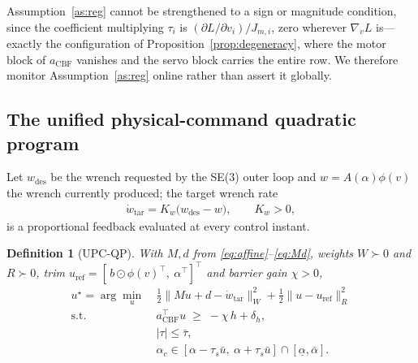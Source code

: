 \documentclass[letter, 10 pt, journal, twoside]{IEEEtran}
\theoremstyle{compact}
\newtheorem{definition}{Definition}
\begin{document}
Assumption~\ref{as:reg} cannot be strengthened to a sign or magnitude condition, %
since the coefficient multiplying $\tau_i$ is $(\partial L/\partial v_i)/J_{m,i}$, zero wherever $\nabla_v L$ is---exactly the configuration of Proposition~\ref{prop:degeneracy}, where the motor block of $a_{\mathrm{CBF}}$ vanishes and the servo block carries the entire row. We therefore monitor Assumption~\ref{as:reg} online rather than assert it globally.%



\subsection{The unified physical-command quadratic program}

Let $w_{\mathrm{des}}$ be the wrench requested by the SE(3) outer loop and $w=A(\alpha)\phi(v)$ the wrench currently produced; the target wrench rate
%
\begin{align}
    \dot w_{\mathrm{tar}} = K_w\big(w_{\mathrm{des}} - w\big), \qquad K_w > 0,
    \label{eq:wtar}
\end{align}
%
is a proportional feedback evaluated at every control instant. %

\begin{definition}[\ac{UPC-QP}]\label{def:upcqp}
With $M,d$ from \eqref{eq:affine}--\eqref{eq:Md}, weights $W\succ0$ and $R\succ0$, trim $u_{\mathrm{ref}}=[\,b\odot\phi(v)^{\!\top},\ \alpha^{\!\top}]^{\!\top}$ and barrier gain $\chi>0$,
\begin{align}
    u^\star = \arg\min_{u}\ &
    \tfrac12\big\|Mu + d - \dot w_{\mathrm{tar}}\big\|_W^2
    + \tfrac12\big\|u-u_{\mathrm{ref}}\big\|_R^2
    \label{eq:obj}\\
    \mathrm{s.t.}\quad
    & a_{\mathrm{CBF}}^{\!\top}u \;\ge\; -\chi\,h + \delta_h,
    \label{eq:cbfrow}\\
    & |\tau|\le\bar\tau,
    \label{eq:taubox}\\
    & \alpha_c \in [\alpha-\tau_s\bar u,\ \alpha+\tau_s\bar u]
      \cap[\underline\alpha,\bar\alpha].
    \label{eq:alphabox}
\end{align}
\end{definition}
\end{document}
